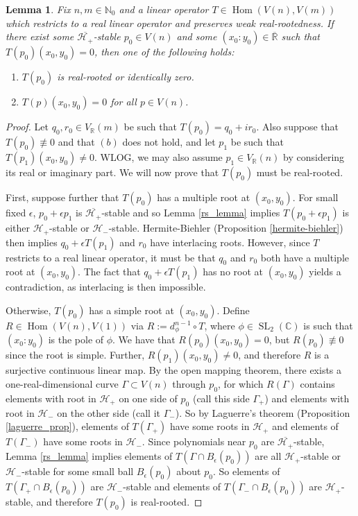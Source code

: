 \documentclass{article}
\newtheorem{lemma}[theorem]{Lemma}
\theoremstyle{definition}
\theoremstyle{plain}
\newcommand{\C}{\mathbb{C}}
\newcommand{\R}{\mathbb{R}}
\newcommand{\N}{\mathbb{N}}
\newcommand{\UHP}{\mathcal{H}_+}
\newcommand{\LHP}{\mathcal{H}_-}
\DeclareMathOperator{\Hom}{Hom}
\DeclareMathOperator{\SL}{SL}
\begin{document}
\begin{lemma}
    Fix $n,m \in \N_0$ and a linear operator $T \in \Hom(V(n),V(m))$ which restricts to a real linear operator and preserves weak real-rootedness. If there exist some $\overline{\UHP}$-stable $p_0 \in V(n)$ and some $(x_0:y_0) \in \overline{\R}$ such that $T(p_0)(x_0,y_0) = 0$, then one of the following holds:
    \begin{enumerate}[label=(\alph*)]
        \item $T(p_0)$ is real-rooted or identically zero.
        \item $T(p)(x_0,y_0) = 0$ for all $p \in V(n)$.
    \end{enumerate}
\end{lemma}
\begin{proof}
    Let $q_0,r_0 \in V_\R(m)$ be such that $T(p_0) = q_0 + ir_0$. Also suppose that $T(p_0) \not\equiv 0$ and that $(b)$ does not hold, and let $p_1$ be such that $T(p_1)(x_0,y_0) \neq 0$. WLOG, we may also assume $p_1 \in V_\R(n)$ by considering its real or imaginary part. We will now prove that $T(p_0)$ must be real-rooted.
    
    First, suppose further that $T(p_0)$ has a multiple root at $(x_0,y_0)$. For small fixed $\epsilon$, $p_0 + \epsilon p_1$ is $\overline{\UHP}$-stable and so Lemma \ref{rs_lemma} implies $T(p_0 + \epsilon p_1)$ is either $\UHP$-stable or $\LHP$-stable. Hermite-Biehler (Proposition \ref{hermite-biehler}) then implies $q_0 + \epsilon T(p_1)$ and $r_0$ have interlacing roots. However, since $T$ restricts to a real linear operator, it must be that $q_0$ and $r_0$ both have a multiple root at $(x_0,y_0)$. The fact that $q_0 + \epsilon T(p_1)$ has no root at $(x_0,y_0)$ yields a contradiction, as interlacing is then impossible.
    
    Otherwise, $T(p_0)$ has a simple root at $(x_0,y_0)$. Define $R \in \Hom(V(n),V(1))$ via $R := d_\phi^{n-1} \circ T$, where $\phi \in \SL_2(\C)$ is such that $(x_0:y_0)$ is the pole of $\phi$. We have that $R(p_0)(x_0,y_0) = 0$, but $R(p_0) \not\equiv 0$ since the root is simple. Further, $R(p_1)(x_0,y_0) \neq 0$, and therefore $R$ is a surjective continuous linear map. By the open mapping theorem, there exists a one-real-dimensional curve $\Gamma \subset V(n)$ through $p_0$, for which $R(\Gamma)$ contains elements with root in $\UHP$ on one side of $p_0$ (call this side $\Gamma_+$) and elements with root in $\LHP$ on the other side (call it $\Gamma_-$). So by Laguerre's theorem (Proposition \ref{laguerre_prop}), elements of $T(\Gamma_+)$ have some roots in $\UHP$ and elements of $T(\Gamma_-)$ have some roots in $\LHP$. Since polynomials near $p_0$ are $\overline{\UHP}$-stable, Lemma \ref{rs_lemma} implies elements of $T(\Gamma \cap B_\epsilon(p_0))$ are all $\UHP$-stable or $\LHP$-stable for some small ball $B_\epsilon(p_0)$ about $p_0$. So elements of $T(\Gamma_+ \cap B_\epsilon(p_0))$ are $\LHP$-stable and elements of $T(\Gamma_- \cap B_\epsilon(p_0))$ are $\UHP$-stable, and therefore $T(p_0)$ is real-rooted.
\end{proof}
\end{document}
